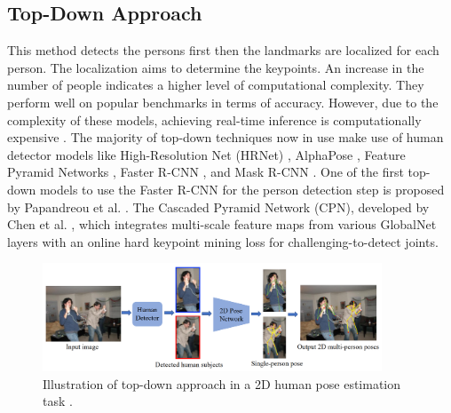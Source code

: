
\subsection{Top-Down Approach}
This method detects the persons first then the landmarks are localized for each person. The localization aims to determine the keypoints. An increase in the number of people indicates a higher level of computational complexity. They perform well on popular benchmarks in terms of accuracy. However, due to the complexity of these models, achieving real-time inference is computationally expensive \cite{YOLO-Pose}. The majority of top-down techniques now in use make use of human detector models like High-Resolution Net (HRNet) \cite{HRNet}, AlphaPose \cite{AlphaPose}, Feature Pyramid Networks \cite{Feature_Pyramid_Network}, Faster R-CNN \cite{FasterRCNN}, and Mask R-CNN \cite{MaskRCNN}. One of the first top-down models to use the Faster R-CNN for the person detection step is proposed by Papandreou et al. \cite{Papandreou}. The Cascaded Pyramid Network (CPN), developed by Chen et al. \cite{Cascade}, which integrates multi-scale feature maps from various GlobalNet layers with an online hard keypoint mining loss for challenging-to-detect joints.

\begin{figure}[h!]
    \centering
    \includegraphics[width=0.9\textwidth]{bab2/ar_TopDown.png}
    \caption{Illustration of top-down approach in a 2D human pose estimation task \cite{HPEApproaches}.}
    \label{fig:TopDown}
\end{figure}

